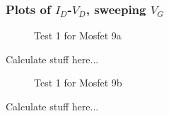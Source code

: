 \documentclass{article}
\begin{document}
\subsubsection{Plots of $I_D$-$V_D$, sweeping $V_G$ }
\begin{figure}[H]
\centering
{}
\caption{Test 1 for Mosfet 9a}
\end{figure}

Calculate stuff here... 

\begin{figure}[H]
\centering
{}
\caption{Test 1 for Mosfet 9b}
\end{figure}

Calculate stuff here...
\end{document}
